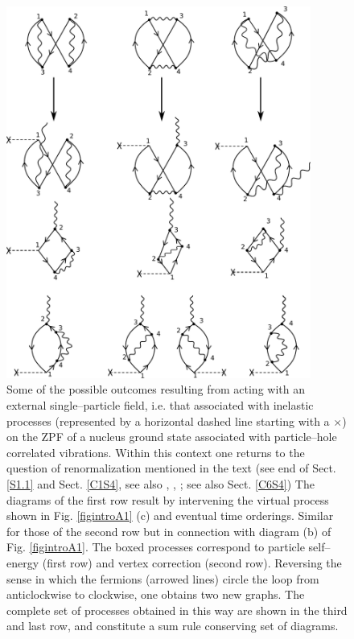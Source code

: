 \begin{figure}
\centerline {
\includegraphics*[width=10cm]{introduccion/figs/figintroA2}
}
\caption{Some of the possible outcomes resulting from acting with an external single--particle field, i.e. that associated with inelastic processes (represented by a horizontal dashed line starting with a $\times$) on the ZPF of a nucleus ground state associated with particle--hole correlated vibrations. Within this context one returns to the question of  renormalization mentioned in the text (see end of Sect. \ref{S1.1} and Sect. \ref{C1S4}, see also \cite{Idini:15}, \cite{Broglia:16}, \cite{Barranco:17}; see also Sect. \ref{C6S4}) The diagrams of the first row result by intervening the virtual process shown in Fig. \ref{figintroA1} (c) and eventual time orderings. Similar for those of the second row but in connection with diagram (b) of Fig. \ref{figintroA1}. The boxed processes correspond to particle self--energy (first row) and vertex correction (second row). Reversing the sense in which the fermions (arrowed lines) circle the loop from anticlockwise to clockwise, one obtains two new graphs. The complete set of processes obtained in this way are shown in the third and last row, and constitute a sum rule conserving set of diagrams.}
\label{figintroA2}
\end{figure}
\clearpage
